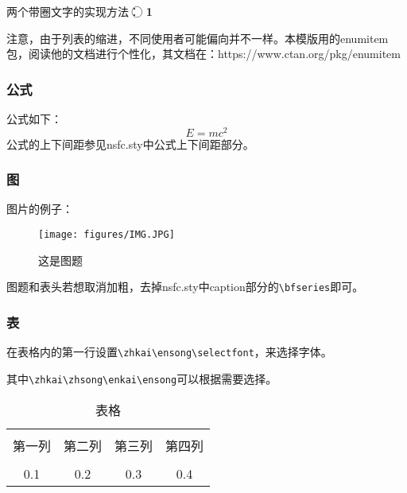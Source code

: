 两个带圈文字的实现方法：
\textcircled{\raisebox{-0.8pt}{1}}
\textcircled{\textbf{\small 1}}

注意，由于列表的缩进，不同使用者可能偏向并不一样。本模版用的enumitem包，阅读他的文档进行个性化，其文档在：https://www.ctan.org/pkg/enumitem


\subsubsection{公式}

公式如下：
\begin{equation}
	E=mc^2
\end{equation}
公式的上下间距参见nsfc.sty中公式上下间距部分。

\subsubsection{图}
图片的例子：
\begin{figure}[h!]
\centering %
\texttt{[image: figures/IMG.JPG]}
\captionsetup{justification=centering} %
\caption{这是图题}
\end{figure}

图题和表头若想取消加粗，去掉nsfc.sty中caption部分的\verb|\bfseries|即可。


\subsubsection{表}
在表格内的第一行设置\verb|\zhkai\ensong\selectfont|，来选择字体。

其中\verb|\zhkai\zhsong\enkai\ensong|可以根据需要选择。
\begin{table}[htbp]
	\zhkai\ensong\selectfont%
	\centering  %
	\caption{表格}  %
	\label{table1}  %
	\begin{tabular}{|c|c|c|c|}  
		\hline  %
		& & & \\[-6pt]  %
		第一列&第二列&第三列&第四列 \\  %
		\hline
		& & & \\[-6pt]  %
		0.1&0.2&0.3&0.4 \\
		\hline
	\end{tabular}
\end{table}

